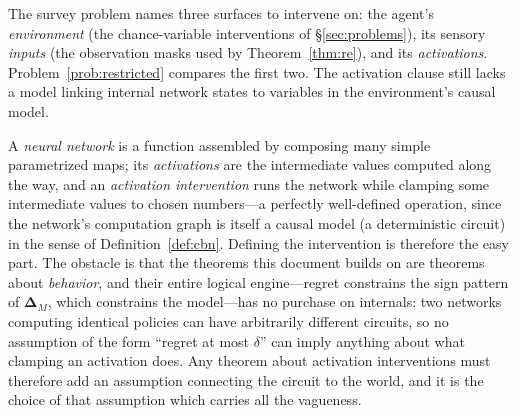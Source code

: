 \documentclass[11pt]{amsart}
\theoremstyle{plain}
\theoremstyle{definition}
\begin{document}
The survey problem names three surfaces to intervene on: the agent's \emph{environment} (the chance-variable interventions of \S\ref{sec:problems}), its sensory \emph{inputs} (the observation masks used by Theorem~\ref{thm:re}), and its \emph{activations}. Problem~\ref{prob:restricted} compares the first two. The activation clause still lacks a model linking internal network states to variables in the environment's causal model.

A \emph{neural network} is a function assembled by composing many simple parametrized maps; its \emph{activations} are the intermediate values computed along the way, and an \emph{activation intervention} runs the network while clamping some intermediate values to chosen numbers---a perfectly well-defined operation, since the network's computation graph is itself a causal model (a deterministic circuit) in the sense of Definition~\ref{def:cbn}. Defining the intervention is therefore the easy part. The obstacle is that the theorems this document builds on are theorems about \emph{behavior}, and their entire logical engine---regret constrains the sign pattern of $\boldsymbol\Delta_M$, which constrains the model---has no purchase on internals: two networks computing identical policies can have arbitrarily different circuits, so no assumption of the form ``regret at most $\delta$'' can imply anything about what clamping an activation does. Any theorem about activation interventions must therefore add an assumption connecting the circuit to the world, and it is the choice of that assumption which carries all the vagueness.
\end{document}
